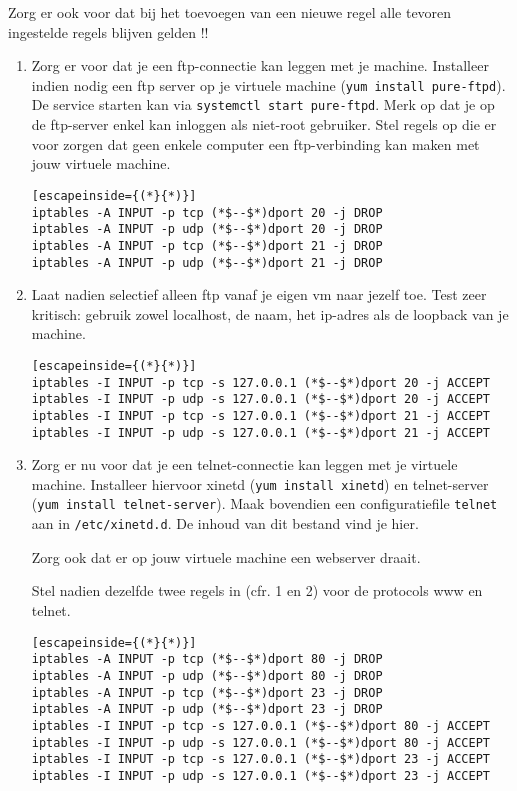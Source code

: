 \documentclass{report}
\begin{document}
Zorg er ook voor dat bij het toevoegen van een nieuwe regel alle tevoren ingestelde regels blijven gelden !!
\begin{enumerate}
	\item     Zorg er voor dat je een ftp-connectie kan leggen met je machine. Installeer indien nodig een ftp server op je virtuele machine (\texttt{yum install pure-ftpd}).
    De service starten kan via \texttt{systemctl start pure-ftpd}. Merk op dat je op de ftp-server enkel kan inloggen als niet-root gebruiker.
	Stel regels op die er voor zorgen dat geen enkele computer een ftp-verbinding kan maken met jouw virtuele machine.
	\begin{lstlisting}[escapeinside={(*}{*)}]
iptables -A INPUT -p tcp (*$--$*)dport 20 -j DROP
iptables -A INPUT -p udp (*$--$*)dport 20 -j DROP
iptables -A INPUT -p tcp (*$--$*)dport 21 -j DROP
iptables -A INPUT -p udp (*$--$*)dport 21 -j DROP
	\end{lstlisting}
	\item     Laat nadien selectief alleen ftp vanaf je eigen vm naar jezelf toe. Test zeer kritisch: gebruik zowel localhost, de naam, het ip-adres als de loopback van je machine.
	\begin{lstlisting}[escapeinside={(*}{*)}]
iptables -I INPUT -p tcp -s 127.0.0.1 (*$--$*)dport 20 -j ACCEPT
iptables -I INPUT -p udp -s 127.0.0.1 (*$--$*)dport 20 -j ACCEPT
iptables -I INPUT -p tcp -s 127.0.0.1 (*$--$*)dport 21 -j ACCEPT
iptables -I INPUT -p udp -s 127.0.0.1 (*$--$*)dport 21 -j ACCEPT
	\end{lstlisting}
	\item     Zorg er nu voor dat je een telnet-connectie kan leggen met je virtuele machine. Installeer hiervoor xinetd (\texttt{yum install xinetd}) en telnet-server (\texttt{yum install telnet-server}). Maak bovendien een configuratiefile \texttt{telnet} aan in \texttt{/etc/xinetd.d}. De inhoud van dit bestand vind je hier.
   
	Zorg ook dat er op jouw virtuele machine een webserver draait.

	Stel nadien dezelfde twee regels in (cfr. 1 en 2) voor de protocols www en telnet.
	\begin{lstlisting}[escapeinside={(*}{*)}]
iptables -A INPUT -p tcp (*$--$*)dport 80 -j DROP
iptables -A INPUT -p udp (*$--$*)dport 80 -j DROP
iptables -A INPUT -p tcp (*$--$*)dport 23 -j DROP
iptables -A INPUT -p udp (*$--$*)dport 23 -j DROP
iptables -I INPUT -p tcp -s 127.0.0.1 (*$--$*)dport 80 -j ACCEPT
iptables -I INPUT -p udp -s 127.0.0.1 (*$--$*)dport 80 -j ACCEPT
iptables -I INPUT -p tcp -s 127.0.0.1 (*$--$*)dport 23 -j ACCEPT
iptables -I INPUT -p udp -s 127.0.0.1 (*$--$*)dport 23 -j ACCEPT
	\end{lstlisting}


\end{enumerate}
\end{document}
